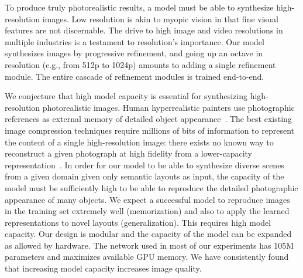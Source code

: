 To produce truly photorealistic results, a model must be able to synthesize high-resolution images. Low resolution is akin to myopic vision in that fine visual features are not discernable. The drive to high image and video resolutions in multiple industries is a testament to resolution's importance. Our model synthesizes images by progressive refinement, and going up an octave in resolution (e.g., from 512p to 1024p) amounts to adding a single refinement module. The entire cascade of refinement modules is trained end-to-end.

We conjecture that high model capacity is essential for synthesizing high-resolution photorealistic images. Human hyperrealistic painters use photographic references as external memory of detailed object appearance~\cite{Letze2013}. The best existing image compression techniques require millions of bits of information to represent the content of a single high-resolution image: there exists no known way to reconstruct a given photograph at high fidelity from a lower-capacity representation~\cite{Sayood2012}. In order for our model to be able to synthesize diverse scenes from a given domain given only semantic layouts as input, the capacity of the model must be sufficiently high to be able to reproduce the detailed photographic appearance of many objects. We expect a successful model to reproduce images in the training set extremely well (memorization) and also to apply the learned representations to novel layouts (generalization). This requires high model capacity. Our design is modular and the capacity of the model can be expanded as allowed by hardware. The network used in most of our experiments has 105M parameters and maximizes available GPU memory. We have consistently found that increasing model capacity increases image quality.

